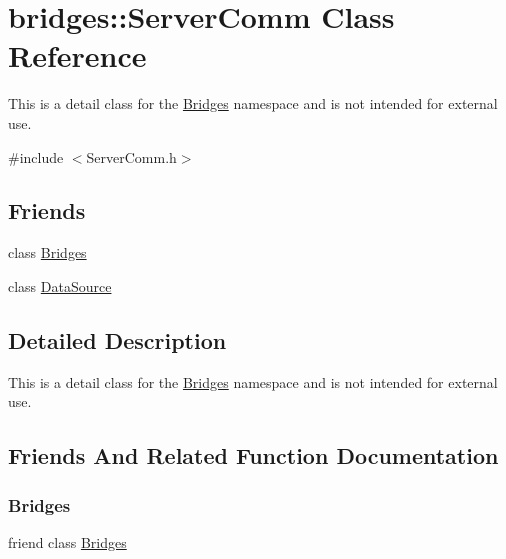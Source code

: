 \hypertarget{classbridges_1_1_server_comm}{}\section{bridges\+:\+:Server\+Comm Class Reference}
\label{classbridges_1_1_server_comm}


This is a detail class for the \mbox{\hyperlink{classbridges_1_1_bridges}{Bridges}} namespace and is not intended for external use.  




{\ttfamily \#include $<$Server\+Comm.\+h$>$}

\subsection*{Friends}
\begin{DoxyCompactItemize}
\item 
class \mbox{\hyperlink{classbridges_1_1_server_comm_a1e7012f84e4df45aa77f36ad8d8375eb}{Bridges}}
\item 
class \mbox{\hyperlink{classbridges_1_1_server_comm_a7998ddaa8bd7c3b9a7cd2a8cbf3573c4}{Data\+Source}}
\end{DoxyCompactItemize}


\subsection{Detailed Description}
This is a detail class for the \mbox{\hyperlink{classbridges_1_1_bridges}{Bridges}} namespace and is not intended for external use. 

\subsection{Friends And Related Function Documentation}
\mbox{\label{classbridges_1_1_server_comm_a1e7012f84e4df45aa77f36ad8d8375eb}} 
\subsubsection{\texorpdfstring{Bridges}{Bridges}}
{\footnotesize\ttfamily friend class \mbox{\hyperlink{classbridges_1_1_bridges}{Bridges}}\hspace{0.3cm}{\ttfamily [friend]}}

